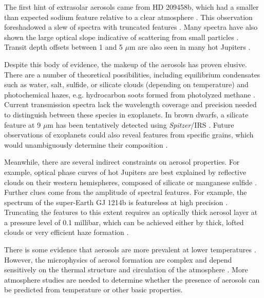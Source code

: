 \documentclass[graybox,natbib,nosecnum]{svmult}
\newcommand{\project}[1]{\textsl{#1}}
\newcommand{\Spitzer}{\project{Spitzer}}
\begin{document}
The first hint of extrasolar aerosols came from HD 209458b, which had a smaller than expected sodium feature relative to a clear atmosphere \citep{charbonneau02}. This observation foreshadowed a slew of spectra with truncated features \citep[e.g.][]{deming13, crossfield13, kreidberg14a, knutson14a, kreidberg15b}. Many spectra have also shown the large optical slope indicative of scattering from small particles \citep[e.g][]{sing11, sing13, robinson14, dragomir15}. Transit depth offsets between 1 and 5 $\mu$m are also seen in many hot Jupiters \citep{sing16}.

Despite this body of evidence, the makeup of the aerosols has proven elusive. There are a number of theoretical possibilities, including equilibrium condensates such as water, salt, sulfide, or silicate clouds (depending on temperature) and photochemical hazes, e.g. hydrocarbon soots formed from photolyzed methane \citep{burrows99, kempton12, morley13, wakeford17}. Current transmission spectra lack the wavelength coverage and precision needed to distinguish between these species in exoplanets.  In brown dwarfs, a silicate feature at 9 $\mu$m has been tentatively detected using \Spitzer/IRS \citep{cushing06}. Future observations of exoplanets could also reveal features from specific grains, which would unambiguously determine their composition \citep{wakeford15}.

Meanwhile, there are several indirect constraints on aerosol properties.  For example, optical phase curves of hot Jupiters are best explained by reflective clouds on their western hemispheres, composed of silicate or manganese sulfide \citep{demory13, oreshenko16, parmentier16}. Further clues come from the amplitude of spectral features. For example, the spectrum of the super-Earth GJ 1214b is featureless at high precision \citep[30 ppm,][]{kreidberg14a}.  Truncating the features to this extent requires an optically thick aerosol layer at a pressure level of 0.1 millibar, which can be achieved either by thick, lofted clouds or very efficient haze formation \citep{morley15}. 

There is some evidence that aerosols are more prevalent at lower temperatures \citep{stevenson16, heng16}. However, the microphysics of aerosol formation are complex and depend sensitively on the thermal structure and circulation of the atmosphere \citep{turco79}. More atmosphere studies are needed to determine whether the presence of aerosols can be predicted from temperature or other basic properties.
\end{document}
